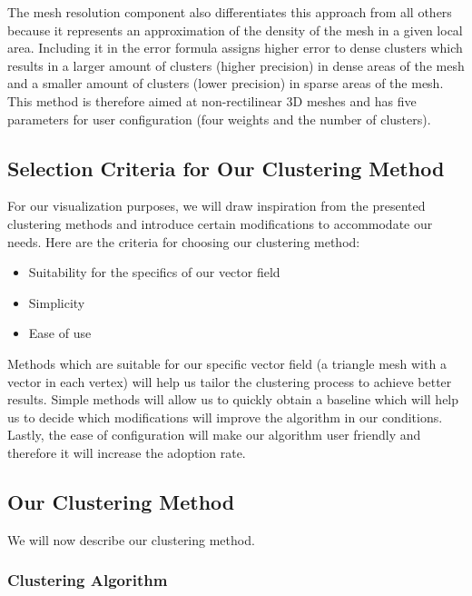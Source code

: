The mesh resolution component also differentiates this approach from all others because it represents an approximation of the density of the mesh in a given local area. Including it in the error formula assigns higher error to dense clusters which results in a larger amount of clusters (higher precision) in dense areas of the mesh and a smaller amount of clusters (lower precision) in sparse areas of the mesh. This method is therefore aimed at non-rectilinear 3D meshes and has five parameters for user configuration (four weights and the number of clusters).
\subsection{Selection Criteria for Our Clustering Method}

For our visualization purposes, we will draw inspiration from the presented clustering methods and introduce certain modifications to accommodate our needs. Here are the criteria for choosing our clustering method:

\begin{itemize}
\item Suitability for the specifics of our vector field
\item Simplicity
\item Ease of use
\end{itemize}

Methods which are suitable for our specific vector field (a triangle mesh with a vector in each vertex) will help us tailor the clustering process to achieve better results. Simple methods will allow us to quickly obtain a baseline which will help us to decide which modifications will improve the algorithm in our conditions. Lastly, the ease of configuration will make our algorithm user friendly and therefore it will increase the adoption rate.

\subsection{Our Clustering Method}

We will now describe our clustering method.

\subsubsection{Clustering Algorithm}
\label{sec:analysis_clustering_algorithm}


